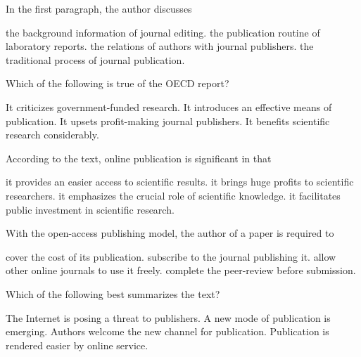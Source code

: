 \item In the first paragraph, the author discusses
\begin{tasks}
	\task the background information of journal editing.
	\task the publication routine of laboratory reports.
	\task the relations of authors with journal publishers.
	\task the traditional process of journal publication.
\end{tasks}
\item Which of the following is true of the OECD report?
\begin{tasks}
	\task It criticizes government-funded research.
	\task It introduces an effective means of publication.
	\task It upsets profit-making journal publishers.
	\task It benefits scientific research considerably.
\end{tasks}
\item According to the text, online publication is significant in that
\begin{tasks}
	\task it provides an easier access to scientific results.
	\task it brings huge profits to scientific researchers.
	\task it emphasizes the crucial role of scientific knowledge.
	\task it facilitates public investment in scientific research.
\end{tasks}
\item With the open-access publishing model, the author of a paper is required to
\begin{tasks}
	\task cover the cost of its publication.
	\task subscribe to the journal publishing it.
	\task allow other online journals to use it freely.
	\task complete the peer-review before submission.
\end{tasks}
\item Which of the following best summarizes the text?
\begin{tasks}
	\task The Internet is posing a threat to publishers.
	\task A new mode of publication is emerging.
	\task Authors welcome the new channel for publication.
	\task Publication is rendered easier by online service.
\end{tasks}